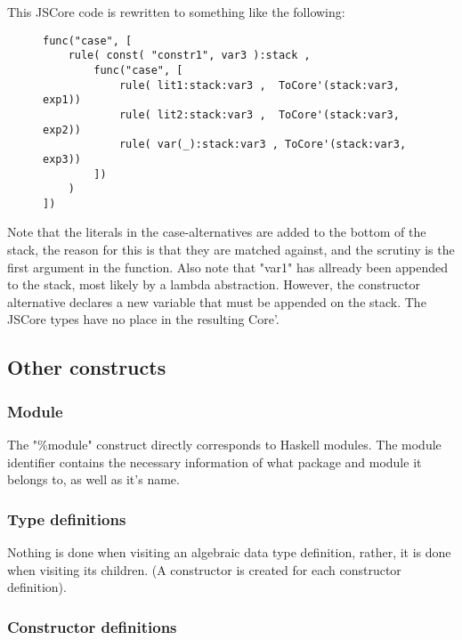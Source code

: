 This JSCore code is rewritten to something like the following:

\begin{figure}[H]
\lstset{ %
language=Haskell,
caption=JSCore case expression in Core',
}
\begin{lstlisting}
func("case", [
    rule( const( "constr1", var3 ):stack ,
        func("case", [  
            rule( lit1:stack:var3 ,  ToCore'(stack:var3, exp1))
            rule( lit2:stack:var3 ,  ToCore'(stack:var3, exp2))
            rule( var(_):stack:var3 , ToCore'(stack:var3, exp3))
        ])
    )
])
\end{lstlisting}
\end{figure}

Note that the literals in the case-alternatives are added to the bottom of the stack,
the reason for this is that they are matched against, and the scrutiny is the first
argument in the function.
Also note that "var1" has allready
been appended to the stack, most likely by a lambda abstraction. However, 
the constructor
alternative declares a new variable that must be appended on the stack.
The JSCore types have no place in the resulting Core'.

\subsection*{Other constructs}

\subsubsection*{Module}

The "\%module" construct directly corresponds to Haskell modules. The module identifier
contains the necessary information of what package and module it belongs to, as
well as it's name.

\subsubsection*{Type definitions}

Nothing is done when visiting an algebraic data type definition, rather, it is done when 
visiting its children. (A constructor is created for each constructor definition).

\subsubsection*{Constructor definitions}

